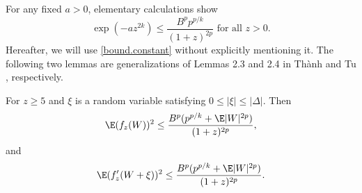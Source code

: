 For any fixed $a>0$, elementary calculations show
	\begin{equation}\label{bound.constant}
	\exp(-a z^{2k})\le \frac{B^pp^{p/k}}{(1+z)^{2p}} \text{ for all } z>0.
	\end{equation}
Hereafter, we will use \eqref{bound.constant} without explicitly mentioning it.
	The following two lemmas are generalizations of Lemmas 2.3 and 2.4 in Th\`{a}nh and Tu \cite{thanh2025non}, respectively.
	\begin{lemma}\label{lem.bs} 
		For $z \ge 5$ and $\xi$ is a random variable satisfying $0\le |\xi|\le |\Delta|$. Then
		\begin{equation}\label{estimate.lem1.01}
			\E(f_{z}(W))^2 \le \dfrac{B^p (p^{p/k}+\E|W|^{2p})}{(1+z)^{2p}},
		\end{equation}
		and
		\begin{equation}\label{estimate.lem1.02}
			\E(f_{z}'(W+\xi))^2 \le \dfrac{B^p (p^{p/k}+\E|W|^{2p})}{(1+z)^{2p}}.
		\end{equation}
	\end{lemma} 
	
